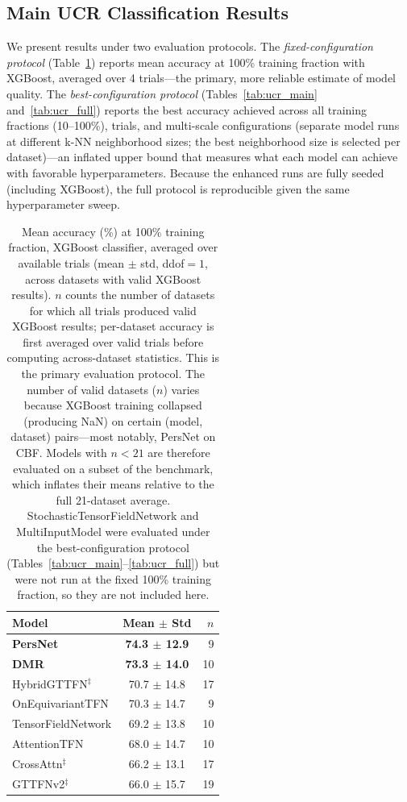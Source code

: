 \documentclass[a4paper,11pt]{article}
\begin{document}
\subsection{Main UCR Classification Results}

We present results under two evaluation protocols.
The \emph{fixed-configuration protocol} (Table~\ref{tab:ucr_honest}) reports mean accuracy at 100\% training fraction with XGBoost, averaged over 4 trials---the primary, more reliable estimate of model quality.
The \emph{best-configuration protocol} (Tables~\ref{tab:ucr_main} and~\ref{tab:ucr_full}) reports the best accuracy achieved across all training fractions (10--100\%), trials, and multi-scale configurations (separate model runs at different k-NN neighborhood sizes; the best neighborhood size is selected per dataset)---an inflated upper bound that measures what each model can achieve with favorable hyperparameters.
Because the enhanced runs are fully seeded (including XGBoost), the full protocol is reproducible given the same hyperparameter sweep.

\begin{table}[ht]
\centering
\caption{Mean accuracy (\%) at 100\% training fraction, XGBoost classifier, averaged over available trials (mean $\pm$ std, ddof$=1$, across datasets with valid XGBoost results). $n$ counts the number of datasets for which all trials produced valid XGBoost results; per-dataset accuracy is first averaged over valid trials before computing across-dataset statistics. This is the primary evaluation protocol. The number of valid datasets ($n$) varies because XGBoost training collapsed (producing NaN) on certain (model, dataset) pairs---most notably, PersNet on CBF. Models with $n<21$ are therefore evaluated on a subset of the benchmark, which inflates their means relative to the full 21-dataset average. StochasticTensorFieldNetwork and MultiInputModel were evaluated under the best-configuration protocol (Tables~\ref{tab:ucr_main}--\ref{tab:ucr_full}) but were not run at the fixed 100\% training fraction, so they are not included here.}
\label{tab:ucr_honest}
\small
\begin{tabular}{lcr}
\toprule
Model & Mean $\pm$ Std & $n$ \\
\midrule
\textbf{PersNet} & \textbf{74.3 $\pm$ 12.9} & 9 \\
\textbf{DMR} & \textbf{73.3 $\pm$ 14.0} & 10 \\
HybridGTTFN$^{\ddagger}$ & 70.7 $\pm$ 14.8 & 17 \\
OnEquivariantTFN & 70.3 $\pm$ 14.7 & 9 \\
TensorFieldNetwork & 69.2 $\pm$ 13.8 & 10 \\
AttentionTFN & 68.0 $\pm$ 14.7 & 10 \\
CrossAttn$^{\ddagger}$ & 66.2 $\pm$ 13.1 & 17 \\
GTTFNv2$^{\ddagger}$ & 66.0 $\pm$ 15.7 & 19 \\
\bottomrule
\end{tabular}
\end{table}
\end{document}
